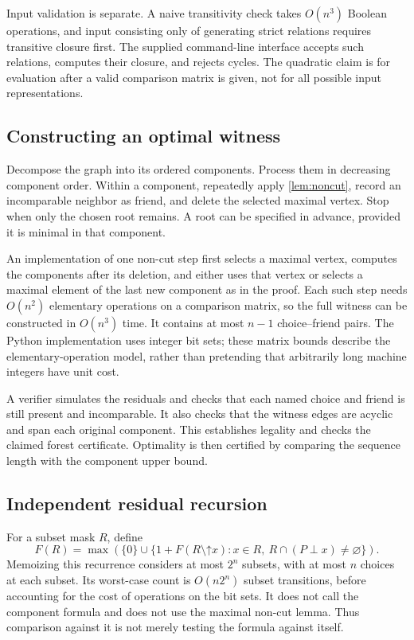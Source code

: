 \documentclass[11pt,letterpaper]{article}
\theoremstyle{definition}
\theoremstyle{remark}
\begin{document}
Input validation is separate. A naive transitivity check takes $O(n^3)$
Boolean operations, and input consisting only of generating strict relations
requires transitive closure first. The supplied command-line interface
accepts such relations, computes their closure, and rejects cycles. The
quadratic claim is for evaluation after a valid comparison matrix is given,
not for all possible input representations.

\subsection{Constructing an optimal witness}
Decompose the graph into its ordered components. Process them in decreasing
component order. Within a component, repeatedly apply \cref{lem:noncut},
record an incomparable neighbor as friend, and delete the selected maximal
vertex. Stop when only the chosen root remains. A root can be specified
in advance, provided it is minimal in that component.

An implementation of one non-cut step first selects a maximal vertex,
computes the components after its deletion, and either uses that vertex or
selects a maximal element of the last new component as in the proof.
Each such step needs $O(n^2)$ elementary operations on a comparison matrix,
so the full witness can be constructed in $O(n^3)$ time. It contains at most
$n-1$ choice--friend pairs. The Python implementation uses integer bit sets;
these matrix bounds describe the elementary-operation model, rather than
pretending that arbitrarily long machine integers have unit cost.

A verifier simulates the residuals and checks that each named choice and
friend is still present and incomparable. It also checks that the witness
edges are acyclic and span each original component. This establishes
legality and checks the claimed forest certificate. Optimality is then
certified by comparing the sequence length with the component upper bound.

\subsection{Independent residual recursion}
For a subset mask $R$, define
\begin{equation}\label{eq:dp}
 F(R)=\max\left(\{0\}\cup
 \{1+F(R\setminus\mathord\uparrow x):x\in R,\ R\cap(P\perp x)\ne\varnothing\}\right).
\end{equation}
Memoizing this recurrence considers at most $2^n$ subsets, with at most $n$
choices at each subset. Its worst-case count is $O(n2^n)$ subset transitions,
before accounting for the cost of operations on the bit sets. It does not
call the component formula and does not use the maximal non-cut lemma.
Thus comparison against it is not merely testing the formula against itself.
\end{document}
